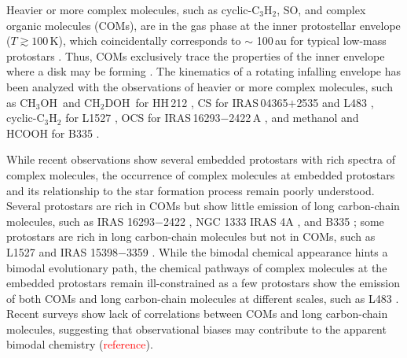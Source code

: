 \documentclass[twocolumn]{aastex62}
\newcommand{\methanol}{\mbox{CH$_{3}$OH}}
\newcommand{\dmethanol}{\mbox{CH$_{2}$DOH}}
\newcommand{\refnote}{\textcolor{red}{reference}}
\begin{document}
Heavier or more complex molecules, such as cyclic-C$_{3}$H$_{2}$, SO, and complex organic molecules (COMs), are in the gas phase at the inner protostellar envelope ($T\gtrsim100$\,K), which coincidentally corresponds to $\sim$ 100\,au for typical low-mass protostars \citep{2020ApJ...891...61Y}.  Thus, COMs exclusively trace the properties of the inner envelope where a disk may be forming \citep{2013ChRv..113.8961A,2014Natur.507...78S}.  The kinematics of a rotating infalling envelope has been analyzed with the observations of heavier or more complex molecules, such as \methanol\ and \dmethanol\ for HH\,212 \citep{2017ApJ...843...27L}, CS for IRAS\,04365$+$2535 \citep{2016ApJ...820L..34S} and L483 \citep{2017ApJ...837..174O}, cyclic-C$_{3}$H$_{2}$ for L1527 \citep{2014Natur.507...78S}, OCS for IRAS\,16293$-$2422\,A \citep{2016ApJ...824...88O}, and methanol and HCOOH for B335 \citep{2019ApJ...873L..21I}.

While recent observations show several embedded protostars with rich spectra of complex molecules, the occurrence of complex molecules at embedded protostars and its relationship to the star formation process remain poorly understood.  Several protostars are rich in COMs but show little emission of long carbon-chain molecules, such as IRAS 16293$-$2422 \citep{2016A&A...595A.117J}, NGC 1333 IRAS 4A \citep{2004ApJ...615..354B,2019ApJ...872..196S}, and B335 \citep{2016ApJ...830L..37I,2019ApJ...873L..21I}; some protostars are rich in long carbon-chain molecules but not in COMs, such as L1527 \citep{2010ApJ...722.1633S} and IRAS 15398$-$3359 \citep{2009ApJ...697..769S}.  While the bimodal chemical appearance hints a bimodal evolutionary path, the chemical pathways of complex molecules at the embedded protostars remain ill-constrained as a few protostars show the emission of both COMs and long carbon-chain molecules at different scales, such as L483 \citep{2017ApJ...837..174O}.  Recent surveys show lack of correlations between COMs and long carbon-chain molecules, suggesting that observational biases may contribute to the apparent bimodal chemistry \citep{2016ApJ...833..125G,2018ApJS..236...52H} (\refnote).
\end{document}
